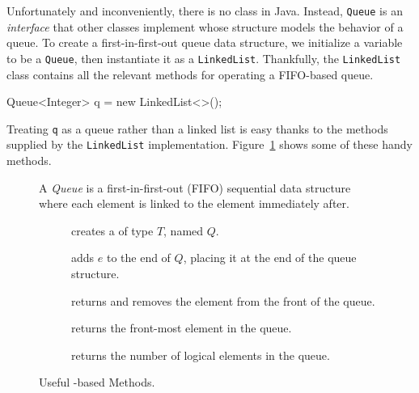 Unfortunately and inconveniently, there is no  class in Java. 
Instead, \texttt{Queue} is an \emph{interface} that other classes implement whose structure models the behavior of a queue. 
To create a first-in-first-out queue data structure, we initialize a variable to be a \texttt{Queue}, then instantiate it as a \texttt{LinkedList}. 
Thankfully, the \texttt{LinkedList} class contains all the relevant methods for operating a FIFO-based queue.

\begin{verbnobox}[\small]
Queue<Integer> q = new LinkedList<>();
\end{verbnobox}

Treating \texttt{q} as a queue rather than a linked list is easy thanks to the methods supplied by the \texttt{LinkedList} implementation. 
Figure~\ref{fig:queues} shows some of these handy methods. 

\begin{figure}[tp]
  \small
  \begin{tcolorbox}[title=Java Queue]
    A \emph{Queue} is a first-in-first-out (FIFO) sequential data structure where each element is linked to the element immediately after.
    \vspace{2ex}
  \begin{description}
    \item [] creates a  of type $T$, named $Q$.
     \item [] adds $e$ to the end of $Q$, placing it at the end of the queue structure.
     \item [] returns and removes the element from the front of the queue.
     \item [] returns the front-most element in the queue.
    \item [] returns the number of logical elements in the queue.
  \end{description}
\end{tcolorbox}
  \caption{Useful -based Methods.}
  \label{fig:queues}
\end{figure}

